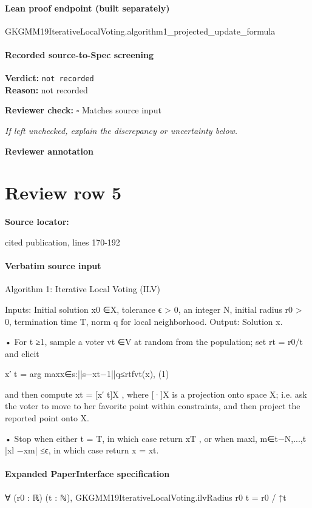 \documentclass[10pt]{article}
\newcommand{\reviewerbox}{%
  \par\noindent\fbox{\parbox{0.96\linewidth}{\rule{0pt}{0.38in}}}\par
}
\newcommand{\reviewmatch}[1]{%
  \par\noindent\textbf{Reviewer check:} $\square$\; #1\par
  \noindent\emph{If left unchecked, explain the discrepancy or uncertainty below.}\par
}
\begin{document}
\paragraph{Lean proof endpoint (built separately)}\begin{ReviewVerbatim}
GKGMM19IterativeLocalVoting.algorithm1_projected_update_formula
\end{ReviewVerbatim}

\paragraph{Recorded source-to-Spec screening}
\textbf{Verdict:} \texttt{not recorded}
\\
\textbf{Reason:} not recorded
\reviewmatch{Matches source input}
\noindent\textbf{Reviewer annotation}\par
\reviewerbox
\clearpage
\hypertarget{source-claim-64105395dd6a3dd4}{}
\section*{Review row 5}
\textbf{Source locator:} {\footnotesize\raggedright cited publication, lines 170-\allowbreak{}192\par}
\paragraph{Verbatim source input}
\begin{ReviewVerbatim}
Algorithm 1: Iterative Local Voting (ILV)

Inputs:
Initial solution x0 ∈X, tolerance ϵ > 0, an integer N, initial radius r0 > 0,
termination time T, norm q for local neighborhood.
Output:
Solution x.

• For t ≥1, sample a voter vt ∈V at random from the population; set rt = r0/t
and elicit

x′
t = arg maxx∈{s:||s−xt−1||q≤rt}fvt(x),
(1)

and then compute xt = [x′
t]X , where [·]X is a projection onto space X; i.e. ask
the voter to move to her favorite point within constraints, and then project the
reported point onto X.

• Stop when either t = T, in which case return xT , or when
maxl, m∈{t−N,...,t} |xl −xm| ≤ϵ, in which case return x = xt.
\end{ReviewVerbatim}


\paragraph{Expanded PaperInterface specification}
\begin{ReviewVerbatim}
∀ (r0 : ℝ) (t : ℕ), GKGMM19IterativeLocalVoting.ilvRadius r0 t = r0 / ↑t
\end{ReviewVerbatim}
\end{document}
